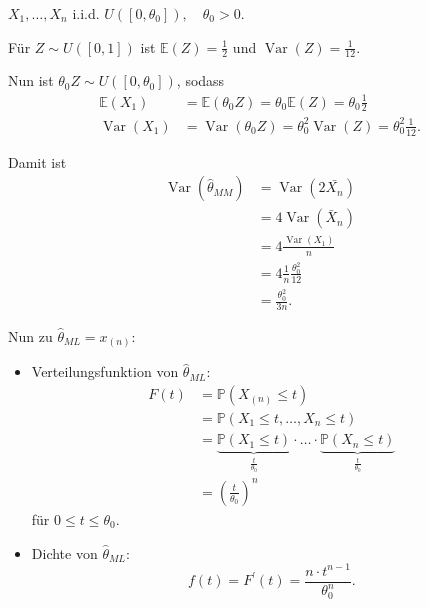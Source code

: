 \documentclass{tstextbook}
\DeclareMathOperator{\Var}{Var}
\newcommand{\E}{\mathbb E}
\newcommand{\Prob}{\mathbb P}
\begin{document}
\begin{example}
	$ X_1,\ldots,X_n $	i.i.d. $ U\left([0,\theta_0]\right), \quad \theta_0 > 0 $. 
	
	Für $ Z\sim U\left([0,1]\right) $ ist $ \E(Z)=\frac{1}{2} $ und $ \Var(Z)=\frac{1}{12} $. 
	
	Nun ist $ \theta_0 Z \sim U\left([0,\theta_0]\right) $, sodass 
	\[
	\begin{aligned}
	\E(X_1) &=\E(\theta_0 Z) = \theta_0 \E(Z) = \theta_0 \frac{1}{2} \\
	\Var(X_1) &= \Var(\theta_0 Z) = \theta_0^2 \Var(Z) = \theta_0^2 \frac{1}{12}.
	\end{aligned}
	\]
	
	Damit ist 
	\[
	\begin{aligned}
	\Var\left(\hat{\theta}_{MM}\right) & = \Var(2\bar{X_n}) \\
	& = 4 \Var(\bar{X}_n) \\
	& = 4 \frac{\Var(X_1)}{n}\\
	& = 4 \frac{1}{n} \frac{\theta_0^2}{12} \\
	& = \frac{\theta_0^2}{3n}. 
	\end{aligned}
	\]
	
	Nun zu $ \hat{\theta}_{ML} = x_{(n)} $: 
	\begin{itemize}
		\item Verteilungsfunktion von $ \hat{\theta}_{ML} $: 
		\[
		\begin{aligned}
			F(t) & = \Prob\left(X_{(n)} \le t \right) \\
			& = \Prob\left(X_1 \le t, \ldots, X_n \le t \right) \\
			& = \underbrace{\Prob\left(X_1 \le t \right)}_{\frac{t}{\theta_0}}\cdot\ldots\cdot \underbrace{\Prob\left(X_n \le t \right)}_{\frac{t}{\theta_0}} \\
			& = \left(\frac{t}{\theta_0}\right)^n 
		\end{aligned}
		\] für $ 0 \le t \le  \theta_0 $.
		
		\item Dichte von $ \hat{\theta}_{ML} $: 
		\[
		f(t) = F^\prime (t) = \frac{n\cdot t^{n-1}}{\theta_0^n}.
		\]
	\end{itemize}


\end{example}
\end{document}
